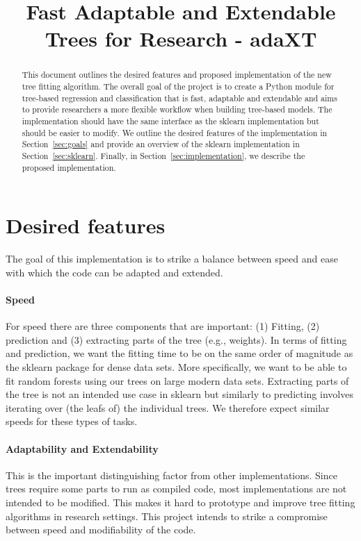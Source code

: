 \documentclass[11pt, a4paper]{article}
\title{Fast Adaptable and Extendable Trees for Research - adaXT}
\author{}
\begin{document}
\maketitle

\begin{abstract}
  This document outlines the desired features and proposed
  implementation of the new tree fitting algorithm. The overall goal
  of the project is to create a Python module for tree-based
  regression and classification that is fast, adaptable and extendable
  and aims to provide researchers a more flexible workflow when
  building tree-based models. The implementation should have the same
  interface as the sklearn implementation but should be easier to
  modify. We outline the desired features of the implementation in
  Section~\ref{sec:goals} and provide an overview of the sklearn
  implementation in Section~\ref{sec:sklearn}. Finally, in
  Section~\ref{sec:implementation}, we describe the proposed
  implementation.
\end{abstract}


\section{Desired features}\label{sec:goals}

The goal of this implementation is to strike a balance between speed
and ease with which the code can be adapted and extended.

\paragraph{Speed}
For speed there are three components that are important: (1) Fitting,
(2) prediction and (3) extracting parts of the tree (e.g.,
weights). In terms of fitting and prediction, we want the fitting time
to be on the same order of magnitude as the sklearn package for dense
data sets. More specifically, we want to be able to fit random forests
using our trees on large modern data sets. Extracting parts of the
tree is not an intended use case in sklearn but similarly to
predicting involves iterating over (the leafs of) the individual
trees. We therefore expect similar speeds for these types of tasks.


\paragraph{Adaptability and Extendability}
This is the important distinguishing factor from other
implementations. Since trees require some parts to run as compiled
code, most implementations are not intended to be modified. This makes
it hard to prototype and improve tree fitting algorithms in research
settings. This project intends to strike a compromise between speed
and modifiability of the code.
\end{document}
